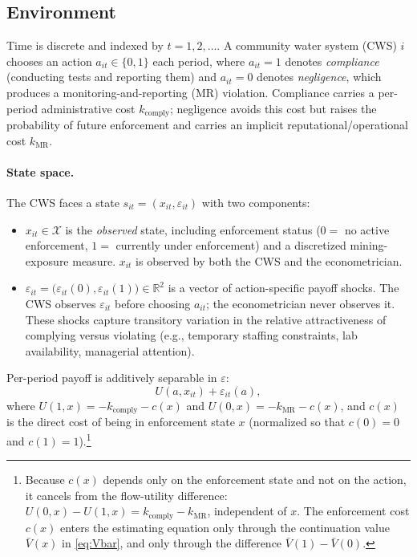 \documentclass{article}
\begin{document}
\subsection{Environment}

Time is discrete and indexed by $t = 1, 2, \ldots$. A community water system
(CWS) $i$ chooses an action $a_{it} \in \{0, 1\}$ each period, where $a_{it} = 1$
denotes \emph{compliance} (conducting tests and reporting them) and $a_{it} = 0$
denotes \emph{negligence}, which produces a monitoring-and-reporting (MR)
violation. Compliance carries a per-period administrative cost $k_{\text{comply}}$;
negligence avoids this cost but raises the probability of future enforcement and
carries an implicit reputational/operational cost $k_{\text{MR}}$.

\paragraph{State space.} The CWS faces a state $s_{it} = (x_{it}, \varepsilon_{it})$
with two components:
\begin{itemize}
\item $x_{it} \in \mathcal{X}$ is the \emph{observed} state, including
      enforcement status ($0 = $ no active enforcement, $1 = $ currently under
      enforcement) and a discretized mining-exposure measure. $x_{it}$ is
      observed by both the CWS and the econometrician.
\item $\varepsilon_{it} = \big(\varepsilon_{it}(0), \varepsilon_{it}(1)\big)
      \in \mathbb{R}^2$ is a vector of action-specific payoff shocks. The CWS
      observes $\varepsilon_{it}$ before choosing $a_{it}$; the econometrician
      never observes it. These shocks capture transitory variation in the
      relative attractiveness of complying versus violating (e.g., temporary
      staffing constraints, lab availability, managerial attention).
\end{itemize}

Per-period payoff is additively separable in $\varepsilon$:
\begin{equation}
U(a, x_{it}) + \varepsilon_{it}(a),
\label{eq:flow}
\end{equation}
where $U(1, x) = -k_{\text{comply}} - c(x)$ and $U(0, x) = -k_{\text{MR}} - c(x)$,
and $c(x)$ is the direct cost of being in enforcement state $x$ (normalized so
that $c(0) = 0$ and $c(1) = 1$).\footnote{Because $c(x)$ depends only on the
enforcement state and not on the action, it cancels from the flow-utility
difference: $U(0, x) - U(1, x) = k_{\text{comply}} - k_{\text{MR}}$,
independent of $x$. The enforcement cost $c(x)$ enters the estimating equation
only through the continuation value $\bar V(x)$ in \eqref{eq:Vbar}, and only
through the difference $\bar V(1) - \bar V(0)$.}
\end{document}
